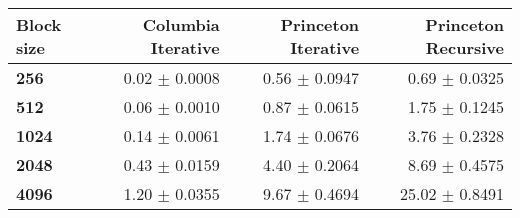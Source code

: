 \begin{tabular}{lrrr}\toprule
\textbf{Block size}  & \textbf{Columbia Iterative} & \textbf{Princeton Iterative} & \textbf{Princeton Recursive}\\\midrule
\textbf{256}  & 0.02 $\pm$ 0.0008 & 0.56 $\pm$ 0.0947 & 0.69 $\pm$ 0.0325\\
\textbf{512}  & 0.06 $\pm$ 0.0010 & 0.87 $\pm$ 0.0615 & 1.75 $\pm$ 0.1245\\
\textbf{1024}  & 0.14 $\pm$ 0.0061 & 1.74 $\pm$ 0.0676 & 3.76 $\pm$ 0.2328\\
\textbf{2048}  & 0.43 $\pm$ 0.0159 & 4.40 $\pm$ 0.2064 & 8.69 $\pm$ 0.4575\\
\textbf{4096} & 1.20 $\pm$ 0.0355 & 9.67 $\pm$ 0.4694 & 25.02 $\pm$ 0.8491\\
\bottomrule
\end{tabular}
